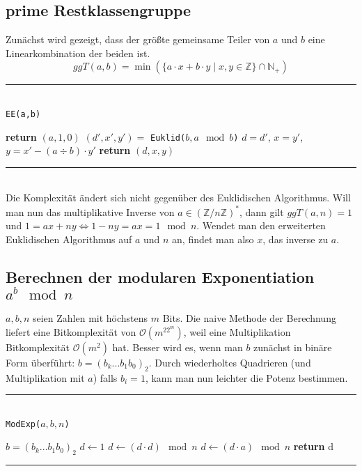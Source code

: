 \documentclass[a4paper, 12pt]{article}
\begin{document}
	\subsection{prime Restklassengruppe}
	Zunächst wird gezeigt, dass der größte gemeinsame Teiler von $a$ und $b$ eine Linearkombination der beiden ist. \[ggT(a,b) = \min(\{a\cdot x + b \cdot y \;|\; x,y\in \mathbb{Z}\} \cap \mathbb{N}_+)\]
	\par\noindent\rule{\textwidth}{0.4pt}\\
	\texttt{EE(a,b)}
	\begin{algorithmic}[1]
		\State \textbf{return} $(a,1,0)$
		\Else
		\State $(d',x',y') =$ \texttt{Euklid($b, a \mod b$)}
		\State $d = d'$, $x = y'$, $y = x'-(a \div b)\cdot y'$
		\State \textbf{return} $(d,x,y)$
		\EndIf
	\end{algorithmic}
	\par\noindent\rule{\textwidth}{0.4pt}\\
	Die Komplexität ändert sich nicht gegenüber des Euklidischen Algorithmus. Will man nun das multiplikative Inverse von $a \in (\mathbb{Z}/n\mathbb{Z})^*$, dann gilt $ggT(a,n) = 1$ und $1 = ax+ny \Leftrightarrow 1-ny = ax = 1 \mod n$. Wendet man den erweiterten Euklidischen Algorithmus auf $a$ und $n$ an, findet man also $x$, das inverse zu $a$.\\
	\subsection{Berechnen der modularen Exponentiation $a^b \mod n$}
	$a,b,n$ seien Zahlen mit höchstens $m$ Bits. Die naive Methode der Berechnung liefert eine Bitkomplexität von $\mathcal{O}(m^22^m)$, weil eine Multiplikation Bitkomplexität $\mathcal{O}(m^2)$ hat. Besser wird es, wenn man $b$ zunächst in binäre Form überführt: $b = (b_k...b_1b_0)_2$. Durch wiederholtes Quadrieren (und Multiplikation mit $a$) falls $b_i = 1$, kann man nun leichter die Potenz bestimmen.\par\noindent\rule{\textwidth}{0.4pt}\\
	\texttt{ModExp($a,b,n$)}
	\begin{algorithmic}[1]
		\State $b = (b_k...b_1b_0)_2$
		\State $d \gets 1$
		\State $d \gets (d\cdot d) \mod n$
		\State $d \gets (d\cdot a) \mod n$
		\EndIf
		\EndFor
		\State \textbf{return} d
	\end{algorithmic}
	\par\noindent\rule{\textwidth}{0.4pt}\\
\end{document}
